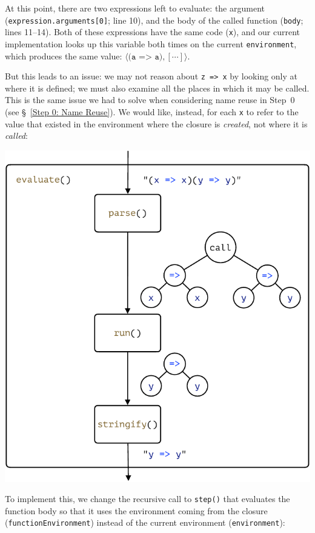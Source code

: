 \documentclass[12pt, oneside]{book}
\begin{document}
At this point, there are two expressions left to evaluate: the argument (\texttt{expression.arguments[0]}; line 10), and the body of the called function (\texttt{body}; lines 11–14). Both of these expressions have the same code (\texttt{x}), and our current implementation looks up this variable both times on the current \texttt{environment}, which produces the same value: $\langle \texttt{(a => a)}, [\cdots] \rangle$.

But this leads to an issue: we may not reason about \texttt{z => x} by looking only at where it is defined; we must also examine all the places in which it may be called. This is the same issue we had to solve when considering name reuse in Step~0 (see §~\ref{Step 0: Name Reuse}). We would like, instead, for each \texttt{x} to refer to the value that existed in the environment where the closure is \emph{created}, not where it is \emph{called}:

\begin{center}
\includegraphics[page = 8]{images.pdf}
\end{center}

To implement this, we change the recursive call to \texttt{step()} that evaluates the function body so that it uses the environment coming from the closure (\texttt{functionEnvironment}) instead of the current environment (\texttt{environment}):
\end{document}
